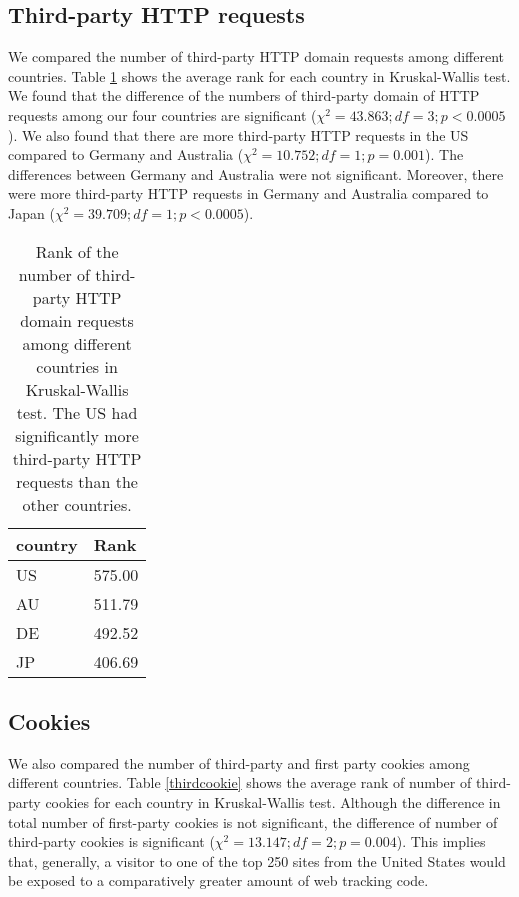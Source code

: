 \documentclass[conference]{IEEEtran}
\newcommand{\todo}[1]{}
\renewcommand{\todo}[1]{{\color{red} TODO: {#1}}}
\begin{document}
\subsection{Third-party HTTP requests}
We compared the number of third-party HTTP domain requests among different countries. 
Table \ref{thirdHTTP} shows the average rank for each country in Kruskal-Wallis test. We found that the difference of the numbers of third-party domain of HTTP requests among our four countries are significant ($\chi^{2} = 43.863; df = 3; p < 0.0005$). We also found that there are more third-party HTTP requests in the US compared to Germany and Australia ($\chi^{2} =10.752; df=1; p=0.001$). The differences between Germany and Australia were not significant. Moreover, there were more third-party HTTP requests in Germany and Australia compared to Japan ($\chi^{2} =39.709; df=1; p<0.0005$).

\begin{table}[t]
\centering
\caption{Rank of the number of third-party HTTP domain requests among different countries in Kruskal-Wallis test. The US had significantly more third-party HTTP requests than the other countries.}
\label{thirdHTTP}
\begin{tabular}{|l|l|}
\hline
\textbf{country} & \textbf{Rank} \\ \hline
US               & 575.00        \\ \hline
AU               & 511.79        \\ \hline
DE               & 492.52        \\ \hline
JP               & 406.69        \\ \hline
\end{tabular}
\end{table}

\subsection{Cookies}
We also compared the number of third-party and first party cookies among different countries. 
Table \ref{thirdcookie} shows the average rank of number of third-party cookies for each country in Kruskal-Wallis test. Although the difference in total number of first-party cookies is not significant, the difference of number of third-party cookies is significant ($\chi^{2}=13.147; df=2; p=0.004$). This implies that, generally, a visitor to one of the top 250 sites from the United States would be exposed to a comparatively greater amount of web tracking code.
\end{document}
